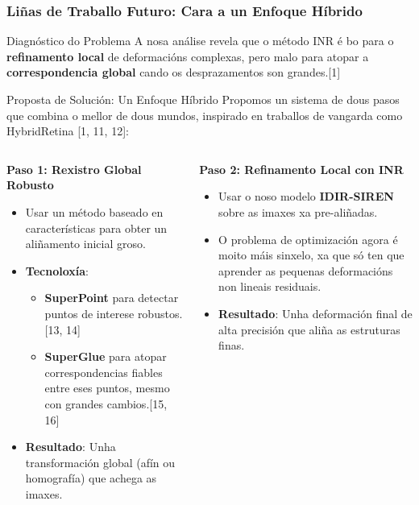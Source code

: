 \documentclass[xcolor=dvipsnames]{beamer}
\begin{document}
\begin{frame}
    \frametitle{Liñas de Traballo Futuro: Cara a un Enfoque Híbrido}
    
    \begin{block}{Diagnóstico do Problema}
        A nosa análise revela que o método INR é bo para o \textbf{refinamento local} de deformacións complexas, pero malo para atopar a \textbf{correspondencia global} cando os desprazamentos son grandes.[1]
    \end{block}
    
    \begin{alertblock}{Proposta de Solución: Un Enfoque Híbrido}
        Propomos un sistema de dous pasos que combina o mellor de dous mundos, inspirado en traballos de vangarda como HybridRetina [1, 11, 12]:
    \end{alertblock}
    
    \begin{columns}
        \begin{column}{0.5\textwidth}
            \centering
            \textbf{Paso 1: Rexistro Global Robusto}
            \begin{itemize}
                \item Usar un método baseado en características para obter un aliñamento inicial groso.
                \item \textbf{Tecnoloxía}:
                \begin{itemize}
                    \item \textbf{SuperPoint} para detectar puntos de interese robustos.[13, 14]
                    \item \textbf{SuperGlue} para atopar correspondencias fiables entre eses puntos, mesmo con grandes cambios.[15, 16]
                \end{itemize}
                \item \textbf{Resultado}: Unha transformación global (afín ou homografía) que achega as imaxes.
            \end{itemize}
        \end{column}
        
        \begin{column}{0.5\textwidth}
            \centering
            \textbf{Paso 2: Refinamento Local con INR}
            \begin{itemize}
                \item Usar o noso modelo \textbf{IDIR-SIREN} sobre as imaxes xa pre-aliñadas.
                \item O problema de optimización agora é moito máis sinxelo, xa que só ten que aprender as pequenas deformacións non lineais residuais.
                \item \textbf{Resultado}: Unha deformación final de alta precisión que aliña as estruturas finas.
            \end{itemize}
        \end{column}
    \end{columns}
    

\end{frame}
\end{document}
